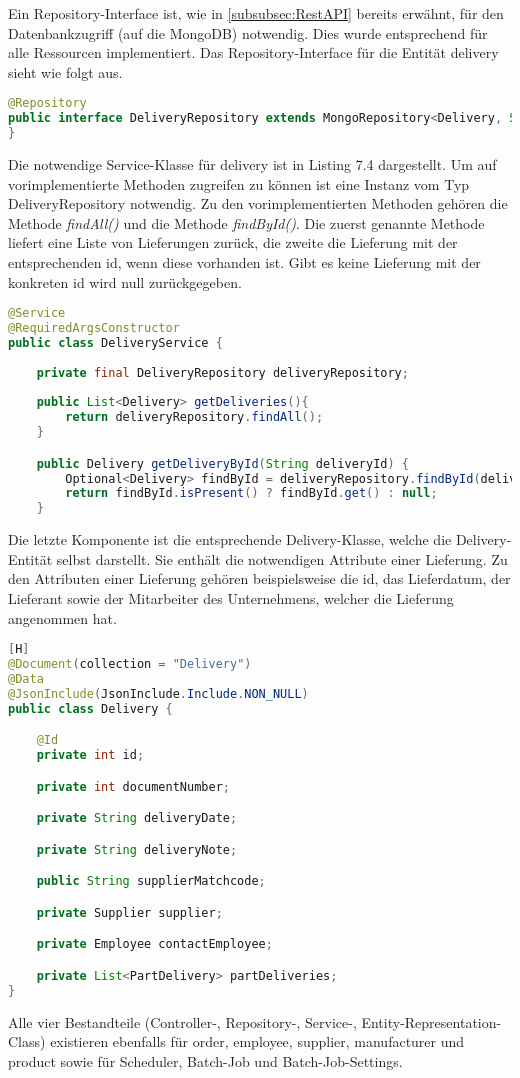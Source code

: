 Ein Repository-Interface ist, wie in \ref{subsubsec:RestAPI} bereits erwähnt, für den Datenbankzugriff (auf die MongoDB) notwendig. Dies wurde entsprechend für alle Ressourcen implementiert. Das Repository-Interface für die Entität delivery sieht wie folgt aus.
\begin{lstlisting}[language=JAVA,caption= Delivery Repository]
@Repository
public interface DeliveryRepository extends MongoRepository<Delivery, String>  {
}
\end{lstlisting}
Die notwendige Service-Klasse für delivery ist in Listing 7.4 dargestellt. Um auf vorimplementierte Methoden zugreifen zu können ist eine Instanz vom Typ DeliveryRepository notwendig. Zu den vorimplementierten Methoden gehören die Methode \textit{findAll()} und die Methode \textit{findById()}. Die zuerst genannte Methode liefert eine Liste von Lieferungen zurück, die zweite die Lieferung mit der entsprechenden id, wenn diese vorhanden ist. Gibt es keine Lieferung mit der konkreten id wird null zurückgegeben.

\begin{lstlisting}[language=JAVA,caption= Delivery Service]
@Service
@RequiredArgsConstructor
public class DeliveryService {
	
	private final DeliveryRepository deliveryRepository;
	
    public List<Delivery> getDeliveries(){
    	return deliveryRepository.findAll();
    }

    public Delivery getDeliveryById(String deliveryId) {
    	Optional<Delivery> findById = deliveryRepository.findById(deliveryId);
    	return findById.isPresent() ? findById.get() : null;
    }
\end{lstlisting}
Die letzte Komponente ist die entsprechende  Delivery-Klasse, welche die Delivery-Entität selbst darstellt. Sie enthält die notwendigen Attribute einer Lieferung. Zu den Attributen einer Lieferung gehören beispielsweise die id, das Lieferdatum, der Lieferant sowie der Mitarbeiter des Unternehmens, welcher die Lieferung angenommen hat.
\begin{lstlisting}[language=JAVA,caption= Delivery][H]
@Document(collection = "Delivery")
@Data
@JsonInclude(JsonInclude.Include.NON_NULL)
public class Delivery {

    @Id
    private int id;

    private int documentNumber;

    private String deliveryDate;

    private String deliveryNote;

    public String supplierMatchcode;

    private Supplier supplier;

    private Employee contactEmployee;

    private List<PartDelivery> partDeliveries;
}
\end{lstlisting}
Alle vier Bestandteile (Controller-, Repository-, Service-, Entity-Representation-Class) existieren ebenfalls für order, employee, supplier, manufacturer und product sowie für Scheduler, Batch-Job und Batch-Job-Settings.

